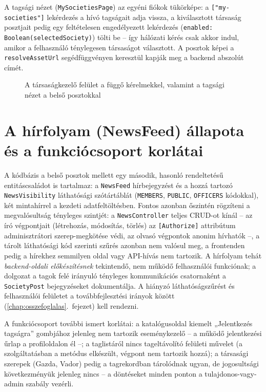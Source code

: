A tagsági nézet (\texttt{MySocietiesPage}) az egyéni fiókok tükörképe: a \texttt{["my-societies"]}
lekérdezés a hívó tagságait adja vissza, a kiválasztott társaság posztjait pedig egy feltételesen
engedélyezett lekérdezés (\texttt{enabled: Boolean(selectedSociety)}) tölti be -- így hálózati
kérés csak akkor indul, amikor a felhasználó ténylegesen társaságot választott. A posztok képei a
\texttt{resolveAssetUrl} segédfüggvényen keresztül kapják meg a backend abszolút címét.

\begin{figure}[htbp]
	\centering
	\caption{A társaságkezelő felület a függő kérelmekkel, valamint a tagsági nézet a belső posztokkal}
	\label{fig:society-manage-screens}
\end{figure}

\section{A hírfolyam (NewsFeed) állapota és a funkciócsoport korlátai}
\label{sec:soc-news}

A kódbázis a belső posztok mellett egy második, hasonló rendeltetésű entitáscsaládot is tartalmaz:
a \texttt{NewsFeed} hírbejegyzést és a hozzá tartozó \texttt{NewsVisibility} láthatósági
szótártáblát (\texttt{MEMBERS}, \texttt{PUBLIC}, \texttt{OFFICERS} kódokkal), két mintahírrel a
kezdeti adatfeltöltésben. Fontos azonban őszintén rögzíteni a megvalósultság tényleges szintjét:
a \texttt{NewsController} teljes CRUD-ot kínál -- az író végpontjait (létrehozás, módosítás,
törlés) az \texttt{[Authorize]} attribútum adminisztrátori szerep-megkötése védi, az olvasó
végpontok anonim hívhatók --, a tárolt láthatósági kód szerinti
szűrés azonban nem valósul meg, a frontenden pedig a hírekhez semmilyen oldal vagy API-hívás nem
tartozik. A hírfolyam tehát \emph{backend-oldali előkészítésnek}
tekintendő, nem működő felhasználói funkciónak; a dolgozat a tagok felé irányuló tényleges
kommunikációs csatornaként a \texttt{SocietyPost} bejegyzéseket dokumentálja. A hiányzó
láthatóságszűrést és felhasználói felületet a továbbfejlesztési irányok között
(\ref{chap:osszefoglalas}.~fejezet) kell rendezni.

A funkciócsoport további ismert korlátai: a katalógusoldal kiemelt „Jelentkezés tagságra” gombjához
jelenleg nem tartozik eseménykezelő -- a működő jelentkezési űrlap a profiloldalon él --; a
taglistáról nincs tageltávolító felületi művelet (a szolgáltatásban a metódus elkészült, végpont
nem tartozik hozzá); a társasági szerepek (Gazda, Vador) pedig a tagrekordban tárolódnak ugyan, de
jogosultsági következményük jelenleg nincs -- a döntéseket minden ponton a tulajdonos-vagy-admin
szabály vezérli.
